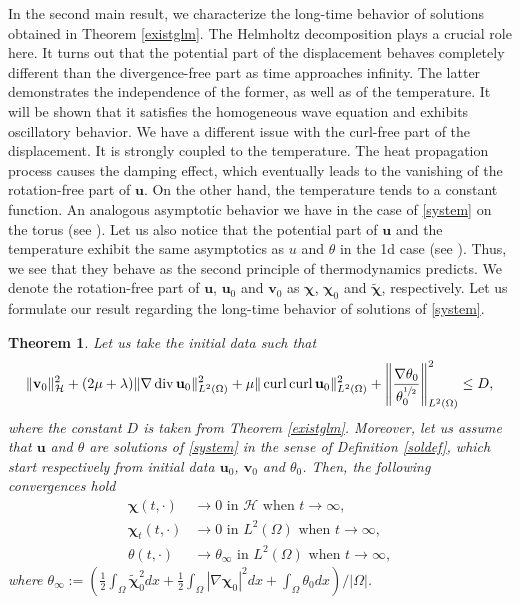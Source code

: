 \documentclass[11pt]{article}
\numberwithin{equation}{section}
\theoremstyle{plain}
\newtheorem{tw}[defi]{Theorem}
\newcommand\bb[1]{\mathbf{#1}}
\newcommand{\io}{\int_{\Omega}}
\newcommand{\ld}{L^2(\Omega)}
\newcommand{\ul}{\frac{1}{2}}
\newcommand{\sul}{\sfrac{1}{2}}
\renewcommand{\div}{\operatorname{div}}
\DeclareMathOperator{\curl}{curl}
\newcommand{\initcond}{\|\bb{v}_0\|^2_{\H}+(2\mu+\lambda)\|\nabla\div\bb u_0\|^2_{\ld}+\mu\|\curl\curl\bb u_0\|_{\ld}^2+\left\|\frac{\nabla\theta_0}{{\theta^{\sul}_0}}\right\|^2_{\ld}\leq D}
\newcommand{\bu}{\bb{u}}
\newcommand{\bs}[1]{\boldsymbol{#1}}
\renewcommand{\H}{\mathcal{H}}
\begin{document}
In the second main result, we characterize the long-time behavior of solutions obtained in Theorem \ref{existglm}. The Helmholtz decomposition plays a crucial role here. It turns out that the potential part of the displacement behaves completely different than the divergence-free part as time approaches infinity. The latter demonstrates the independence of the former, as well as of the temperature. It will be shown that it satisfies the homogeneous wave equation and exhibits oscillatory behavior. We have a different issue with the curl-free part of the displacement. It is strongly coupled to the temperature. The heat propagation process causes the damping effect, which eventually leads to the vanishing of the rotation-free part of $\bu$. On the other hand, the temperature tends to a constant function. An analogous asymptotic behavior we have in the case of \eqref{system} on the torus (see \cite{Biest}). Let us also notice that the potential part of $\bu$ and the temperature exhibit the same asymptotics as $u$ and $\theta$ in the 1d case (see \citep{BC2}). Thus, we see that they behave as the second principle of thermodynamics predicts. We denote the rotation-free part of $\bu$, $\bu_0$ and $\bb v_0$  as $\bs\chi$, $\bs\chi_0$ and $\tilde{\bs\chi}$, respectively.  Let us formulate our result regarding the long-time behavior of solutions of \eqref{system}.
\begin{tw}\label{twassm}
Let us take the initial data such that 
\begin{align}\label{assyassu}
\initcond,
\end{align}
where the constant $D$ is taken from Theorem \ref{existglm}. Moreover, let us assume that $\bu$ and $\theta$ are solutions of \eqref{system} in the sense of Definition \ref{soldef}, which start respectively from initial data $\bu_0$, $\bb v_0$ and $\theta_0$. Then, the following convergences hold
\begin{align*}
\bs\chi(t,\cdot)&\to 0\textrm{ in }\H \textrm{ when }t\to\infty,\\
\bs\chi_t(t,\cdot)&\to 0\textrm{ in }\ld \textrm{ when }t\to\infty,\\
\theta(t,\cdot)&\to \theta_{\infty}\textrm{ in }\ld \textrm{ when }t\to\infty,
\end{align*}
where $\theta_{\infty}:=\left(\ul\io \tilde{\bs\chi}_0^2dx+\ul\io |\nabla\bs\chi_0|^2dx+\io\theta_0 dx\right)/|\Omega|$.
\end{tw}
\end{document}

